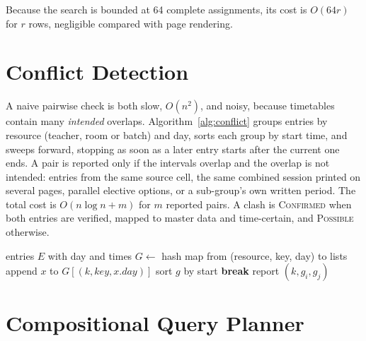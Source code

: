 \documentclass[conference]{IEEEtran}
\begin{document}
Because the search is bounded at 64 complete assignments, its cost is $O(64r)$ for $r$ rows, negligible
compared with page rendering.

\section{Conflict Detection}
A naive pairwise check is both slow, $O(n^2)$, and noisy, because timetables contain many \emph{intended}
overlaps. Algorithm~\ref{alg:conflict} groups entries by resource (teacher, room or batch) and day, sorts
each group by start time, and sweeps forward, stopping as soon as a later entry starts after the current
one ends. A pair is reported only if the intervals overlap and the overlap is not intended: entries from
the same source cell, the same combined session printed on several pages, parallel elective options, or a
sub-group's own written period. The total cost is $O(n\log n + m)$ for $m$ reported pairs. A clash is
\textsc{Confirmed} when both entries are verified, mapped to master data and time-certain, and
\textsc{Possible} otherwise.

\begin{algorithm}[t]
\caption{Group, sort and sweep}\label{alg:conflict}
\begin{algorithmic}[1]
\Require entries $E$ with day and times
\State $G \gets$ hash map from (resource, key, day) to lists
  \State append $x$ to $G[(k,\mathit{key},x.\mathit{day})]$
\EndFor
{}
  \State sort $g$ by start
       \textbf{break} \EndIf
       report $(k,g_i,g_j)$ \EndIf
    \EndFor
  \EndFor
\EndFor
\end{algorithmic}
\end{algorithm}

\section{Compositional Query Planner}
\end{document}
